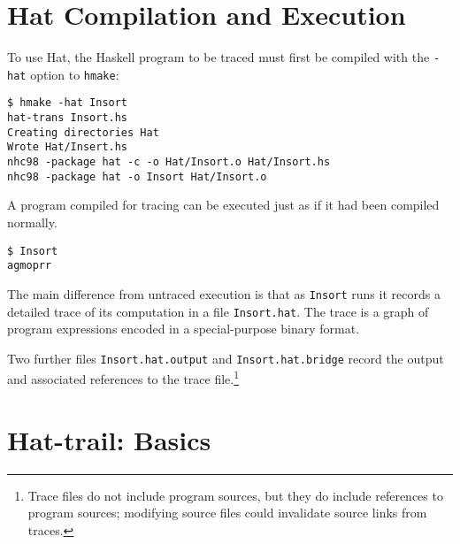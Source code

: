 \documentclass[12pt]{article}
\begin{document}
\section{Hat Compilation and Execution}

To use Hat, the Haskell program to be traced must first be
compiled with the {\tt -hat} option to {\tt hmake}:

\begin{tabbing}
{\tt \$ hmake -hat Insort} \\
{\tt hat-trans Insort.hs} \\
{\tt Creating directories Hat} \\
{\tt Wrote Hat/Insert.hs} \\
{\tt nhc98 -package hat -c -o Hat/Insort.o Hat/Insort.hs} \\
{\tt nhc98 -package hat -o Insort Hat/Insort.o}
\end{tabbing}

A program compiled for tracing can be executed just as
if it had been compiled normally.
\begin{tabbing}
{\tt \$ Insort} \\
{\tt agmoprr}
\end{tabbing}
The main difference from untraced execution is that as {\tt Insort} runs
it records a detailed trace of its computation in a file {\tt Insort.hat}.
The trace is a graph of program expressions encoded in a special-purpose
binary format.

Two further files {\tt Insort.hat.output} and
{\tt Insort.hat.bridge}
record the output and associated references to the trace file.\footnote{
Trace files do not include program sources, but they do include
references to program sources; modifying source files could invalidate
source links from traces.}

\section{Hat-trail: Basics}
\end{document}
